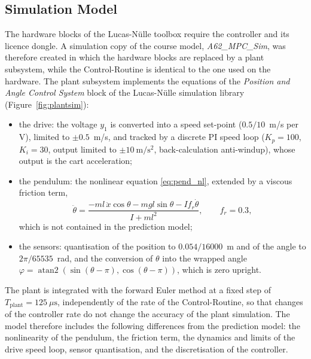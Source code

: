 \subsection{Simulation Model}
\label{subsec:simmodel}

The hardware blocks of the Lucas-Nülle toolbox require the controller and its
licence dongle. A simulation copy of the course model,
\emph{A62\_MPC\_Sim}, was therefore created in which the hardware blocks are
replaced by a plant subsystem, while the Control-Routine is identical to the
one used on the hardware. The plant subsystem implements the equations of the
\emph{Position and Angle Control System} block of the Lucas-Nülle simulation
library~\cite{ln_manual} (Figure~\ref{fig:plantsim}):
\begin{itemize}
  \item the drive: the voltage $y_1$ is converted into a speed set-point
        ($0.5/10$~m/s per V), limited to $\pm 0.5$~m/s, and tracked by a
        discrete PI speed loop ($K_p = 100$, $K_i = 30$, output limited to
        $\pm 10~\mathrm{m/s^2}$, back-calculation anti-windup), whose output is
        the cart acceleration;
  \item the pendulum: the nonlinear equation \eqref{eq:pend_nl}, extended by a
        viscous friction term,
        \begin{equation}
          \ddot{\theta} = \frac{-ml\,\ddot{x}\cos\theta - mgl\sin\theta
                                - I f_r\dot{\theta}}{I + ml^2},
          \qquad f_r = 0.3,
          \label{eq:plant_sim}
        \end{equation}
        which is not contained in the prediction model;
  \item the sensors: quantisation of the position to $0.054/16000$~m and of
        the angle to $2\pi/65535$~rad, and the conversion of $\theta$ into the
        wrapped angle $\varphi = \operatorname{atan2}(\sin(\theta-\pi),
        \cos(\theta-\pi))$, which is zero upright.
\end{itemize}
The plant is integrated with the forward Euler method at a fixed step of
$T_{\mathrm{plant}} = 125~\mu\mathrm{s}$, independently of the rate of the
Control-Routine, so that changes of the controller rate do not change the
accuracy of the plant simulation. The model therefore includes the following
differences from the prediction model: the nonlinearity of the pendulum, the
friction term, the dynamics and limits of the drive speed loop, sensor
quantisation, and the discretisation of the controller.


